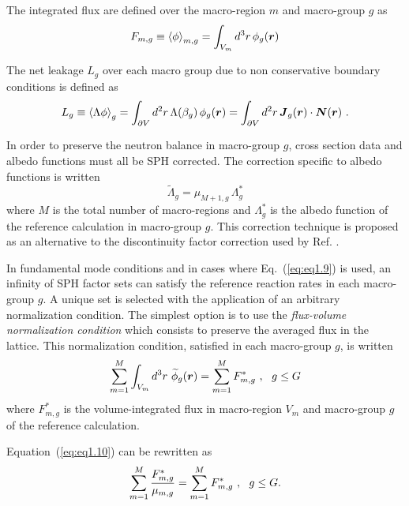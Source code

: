 \vskip 0.08cm

The integrated flux are defined over the macro-region $m$ and macro-group $g$ as
\begin{equation}
F_{m,g}\equiv \left< \phi \right>_{m,g}=\int_{V_m} d^3r \, \phi_g(\bff(r))
\label{eq:eq1.7a}
\end{equation}

\vskip 0.08cm

The net leakage $L_{g}$ over each macro group due to non conservative boundary conditions is defined as
\begin{equation}
L_{g}\equiv \left< \Lambda\phi\right>_g= \int_{\partial V} d^2r \, \Lambda(\beta_g) \, \phi_g(\bff(r)) =\int_{\partial V} d^2r \,\bff(J)_g(\bff(r))\cdot \bff(N)(\bff(r))\ .
\label{eq:eq1.8}
\end{equation}

\vskip 0.08cm

In order to preserve the neutron balance in macro-group $g$, cross section data and albedo functions must all be SPH corrected. The correction specific to albedo functions is written
\begin{equation}
\tilde\Lambda_g=\mu_{M+1,g}\, \Lambda^*_g
\label{eq:eq1.9}
\end{equation}
\noindent where $M$ is the total number of macro-regions and $\Lambda^*_g$ is the albedo function of the reference calculation in macro-group $g$. This
correction technique is proposed as an alternative to the discontinuity factor correction used by Ref. .

\vskip 0.08cm

In fundamental mode conditions and in cases where Eq.~(\ref{eq:eq1.9}) is used, an infinity of
SPH factor sets can satisfy the reference reaction rates in each macro-group $g$.
A unique set is selected with the application of an arbitrary normalization condition. The simplest option is to use the {\sl flux-volume normalization condition} which consists to preserve the averaged flux
in the lattice. This normalization condition, satisfied in each macro-group $g$, is written
\begin{equation}
\sum_{m=1}^M \int_{V_m} d^3r \ \widetilde\phi_{g}(\bff(r))=\sum_{m=1}^M F_{m,g}^{*} \ , \ \ g \le G
\label{eq:eq1.10}
\end{equation}
\noindent where $F_{m,g}^{*}$ is the volume-integrated flux in macro-region $V_m$ and macro-group $g$ of the reference calculation.

\vskip 0.08cm

Equation~(\ref{eq:eq1.10}) can be rewritten as
\begin{equation}
\sum_{m=1}^M {F_{m,g}^{*}\over \mu_{m,g}}=\sum_{m=1}^M F_{m,g}^{*}  \ , \ \ g \le G .
\label{eq:eq1.11}
\end{equation}

